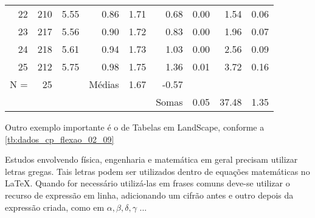 \begin{table}[H]
{\begin{tabular}{@{}rrrrrrrrr@{}}
22 & 210 & 5.55 & 0.86 & 1.71 & 0.68 & 0.00 & 1.54 & 0.06 \\
23 & 217 & 5.56 & 0.90 & 1.72 & 0.83 & 0.00 & 1.96 & 0.07 \\
24 & 218 & 5.61 & 0.94 & 1.73 & 1.03 & 0.00 & 2.56 & 0.09 \\
25 & 212 & 5.75 & 0.98 & 1.75 & 1.36 & 0.01 & 3.72 & 0.16 \\
N = & 25 &  & Médias & 1.67 & -0.57 &  &  &  \\
 &  &  &  &  & Somas & 0.05 & 37.48 & 1.35 \\ 
\bottomrule
\end{tabular}
}
\end{table}

Outro exemplo importante é o de Tabelas em LandScape, conforme a \autoref{tb:dados_cp_flexao_02_09}

Estudos envolvendo física, engenharia e matemática em geral precisam utilizar letras gregas. Tais letras podem ser utilizados dentro de equações matemáticas no \LaTeX. Quando for necessário utilizá-las em frases comuns deve-se utilizar o recurso de expressão em linha, adicionando um cifrão antes e outro depois da expressão criada, como em $\alpha , \beta , \delta, \gamma $ ...